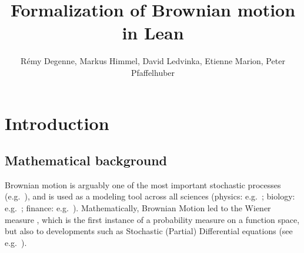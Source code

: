 \documentclass[lean]{Draft}
\title[Formalization of Brownian motion in Lean]{Formalization of Brownian motion in Lean}
\author[R. Degenne, M. Himmel, D. Ledvinka, E. Marion, P. Pfaffelhuber]{
  Rémy Degenne, Markus Himmel, David Ledvinka, Etienne Marion, Peter Pfaffelhuber}
\makeatletter
\newcommand\leanlink{\begingroup\catcode`\#=12\relax\@leanlink}
\newcommand\@leanlink[2]{\endgroup
\href{#1}
{\texttt{\detokenize{#2}}}}
\makeatother
\begin{document}



\section{Introduction}

\subsection{Mathematical background}
\sloppy Brownian motion is arguably one of the most important stochastic processes (e.g.\ \cite{karatzas1991brownian, morters2010brownian}), and is used as a modeling tool across all sciences (physics: e.g.\ \cite{einstein1906theorie, bian2016111}; biology: e.g.\ \cite{erban2014molecular}; finance: e.g.\ \cite{davis2006louis}). Mathematically, Brownian Motion led to the Wiener measure \cite{wiener1923differential}, which is the first instance of a probability measure on a function space, but also to developments such as Stochastic (Partial) Differential equations (see e.g.\ \cite{hairer2009introduction}).
\end{document}
